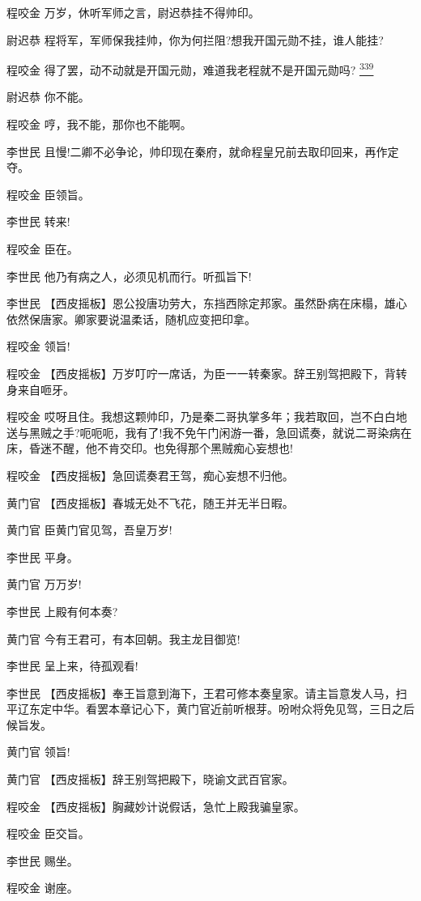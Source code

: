程咬金 万岁，休听军师之言，尉迟恭挂不得帅印。

尉迟恭 程将军，军师保我挂帅，你为何拦阻?想我开国元勋不挂，谁人能挂?

程咬金 得了罢，动不动就是开国元勋，难道我老程就不是开国元勋吗?
\protect\hyperlink{fn339}{\textsuperscript{339}}

尉迟恭 你不能。

程咬金 哼，我不能，那你也不能啊。

李世民
且慢!二卿不必争论，帅印现在秦府，就命程皇兄前去取印回来，再作定夺。

程咬金 臣领旨。

李世民 转来!

程咬金 臣在。

李世民 他乃有病之人，必须见机而行。听孤旨下!

李世民
【西皮摇板】恩公投唐功劳大，东挡西除定邦家。虽然卧病在床榻，雄心依然保唐家。卿家要说温柔话，随机应变把印拿。

程咬金 领旨!

程咬金
【西皮摇板】万岁叮咛一席话，为臣一一转秦家。辞王别驾把殿下，背转身来自咂牙。

程咬金
哎呀且住。我想这颗帅印，乃是秦二哥执掌多年；我若取回，岂不白白地送与黑贼之手?呃呃呃，我有了!我不免午门闲游一番，急回谎奏，就说二哥染病在床，昏迷不醒，他不肯交印。也免得那个黑贼痴心妄想也!

程咬金 【西皮摇板】急回谎奏君王驾，痴心妄想不归他。

黄门官 【西皮摇板】春城无处不飞花，随王并无半日暇。

黄门官 臣黄门官见驾，吾皇万岁!

李世民 平身。

黄门官 万万岁!

李世民 上殿有何本奏?

黄门官 今有王君可，有本回朝。我主龙目御览!

李世民 呈上来，待孤观看!

李世民
【西皮摇板】奉王旨意到海下，王君可修本奏皇家。请主旨意发人马，扫平辽东定中华。看罢本章记心下，黄门官近前听根芽。吩咐众将免见驾，三日之后候旨发。

黄门官 领旨!

黄门官 【西皮摇板】辞王别驾把殿下，晓谕文武百官家。

程咬金 【西皮摇板】胸藏妙计说假话，急忙上殿我骗皇家。

程咬金 臣交旨。

李世民 赐坐。

程咬金 谢座。

